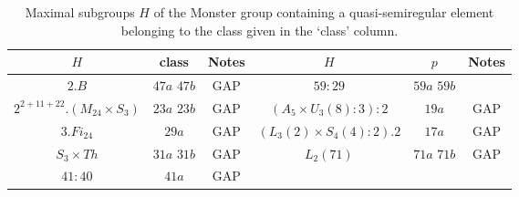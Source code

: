 \documentclass{article}
\theoremstyle{remark}
\theoremstyle{definition}
\newcommand{\qsre}{quasi-semiregular element}
\begin{document}
\begin{table}[h]
    \centering
    \begin{tabular}{|c|c|c||c|c|c|} \hline
         $H$&  class & Notes & $H$& $p$ & Notes \\ \hline
         $2.B$                              &  $47a$  $47b$   &  GAP  & $59:29$                       & $59a$  $59b$  &   \\
         $2^{2+11+22}.(M_{24}\times S_3)$   &  $23a$  $23b$   &    GAP   & $(A_5 \times U_3(8):3):2$     & $19a$    &    GAP\\
         $3.Fi_{24}$                        &  $29a$          & GAP   & $(L_3(2) \times S_4(4):2).2$  & $17a$    &  GAP\\
         $S_3 \times Th$                    &  $31a$  $31b$   & GAP   & $L_2(71)$                     & $71a$  $71b$    &  GAP \\
         $41:40$                            &  $41a$          &  GAP  &                               &       &  \\ \hline
    \end{tabular}
    \caption{Maximal subgroups $H$ of the Monster group containing a {\qsre} belonging to the class given in the `class' column.}
    \label{tab:M}
\end{table}
\end{document}
